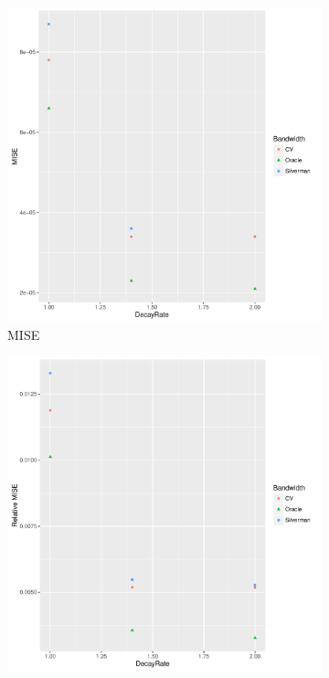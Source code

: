 \begin{figure}[htb]
    \centering
    \begin{subfigure}[b]{0.3\textwidth}
    \includegraphics[width=\textwidth]{results/by_population_decay/MISE-vs-population-decay}
    \caption{MISE}
    \end{subfigure}
    \begin{subfigure}[b]{0.3\textwidth}
    \includegraphics[width=\textwidth]{results/by_population_decay/RMISE-vs-population-decay}

\end{subfigure}
\end{figure}
